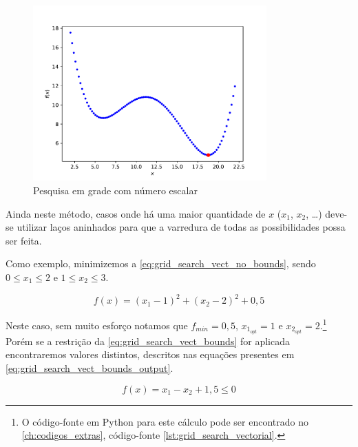 \begin{figure}
	\begin{center}
		\includegraphics[width=0.8\textwidth]{./5_images/fig_grid_search_scalar.pdf} 
		\caption{Pesquisa em grade com número escalar}
		\label{fig:grid_search_scalar}
	\end{center}
\end{figure}

Ainda neste método, casos onde há uma maior quantidade de $x$ ($x_1$, $x_2$, \dots)
deve-se utilizar laços aninhados para que a varredura de todas as possibilidades
possa ser feita. 

Como exemplo, minimizemos a \cref{eq:grid_search_vect_no_bounds}, sendo
$0 \leq x_1 \leq 2$ e $1 \leq x_2 \leq 3$.

\begin{equation}
	\label{eq:grid_search_vect_no_bounds}
	f(x) = (x_1 - 1)^2 + (x_2 - 2)^2 + 0,5
\end{equation}

Neste caso, sem muito esforço notamos que
$f_{min} = 0,5$, $x_{1_{opt}} = 1$ e $x_{2_{opt}} = 2$.\footnote{
	O código-fonte em Python para este cálculo pode ser encontrado no							%
	\cref{ch:codigos_extras}, código-fonte \ref{lst:grid_search_vectorial}.}					%
Porém se a restrição da \cref{eq:grid_search_vect_bounds} for aplicada
encontraremos valores distintos, descritos nas equações presentes em
\cref{eq:grid_search_vect_bounds_output}.

\begin{equation}
	\label{eq:grid_search_vect_bounds}
	f(x) = x_1 - x_2 + 1,5 \leq 0
\end{equation}


